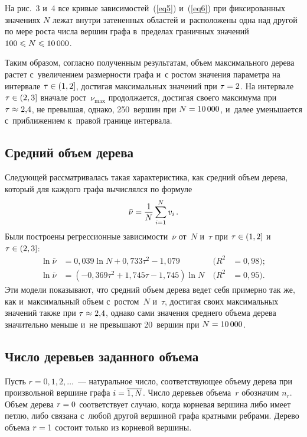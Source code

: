 \begin{multicols}{2}
На рис.~3 и~4 все кривые зависимостей~(\ref{eq5}) и~(\ref{eq6}) при 
фиксированных значениях $N$ лежат внутри затененных областей и~расположены одна 
над другой по мере роста числа вершин графа в~пределах граничных значений 
$100\hm\leqslant N\hm\leqslant 10\,000$.

Таким образом, согласно полученным результатам, объем максимального дерева 
растет с~увеличением размерности графа и~с ростом значения параметра на интервале 
$\tau\hm\in(1,2]$,
достигая максимальных значений при $\tau\hm=2$.
На интервале $\tau\hm\in(2,3]$ вначале рост~$\nu_{\max}$ продолжается, достигая 
своего максимума
при $\tau\hm\approx 2{,}4$, не превышая, однако, 250~вершин при $N\hm=10\,000$, и~далее 
уменьшается с~приближением к~правой границе интервала.

\vspace*{-4pt}

\subsection{Средний объем дерева}

Следующей рассматривалась такая характеристика, как средний объем дерева, 
который для каж\-до\-го графа вычислялся по формуле
\begin{equation*}
\bar{\nu}=\displaystyle\frac{\displaystyle 1\mathstrut}{\displaystyle N\mathstrut}\sum\limits_{i=1}^N v_i\,.
\end{equation*}
Были построены регрессионные зависимости~$\bar{\nu}$ от~$N$ и~$\tau$ при 
$\tau\hm\in(1,2]$ и~$\tau\hm\in(2,3]$:
\begin{alignat*}{2}
\ln\bar{\nu} &= 0{,}039\ln N + 0{,}733 \tau^2 - 1{,}079 &\ (R^2&=0{,}98);
\\
\ln\bar{\nu} &= (-0{,}369 \tau^2+1{,}745 \tau-1{,}745)\ln N &\ (R^2&=0{,}95).
\end{alignat*}
Эти модели показывают, что средний объем дерева ведет себя примерно так же, как и~максимальный объем с~ростом~$N$ и~$\tau$, достигая своих максимальных значений 
также при $\tau\hm\approx 2{,}4$, однако сами значения среднего объема дерева 
значительно меньше и~не превышают 20~вершин при $N\hm=10\,000$.



\subsection{Число деревьев заданного объема}

Пусть $r=0,1,2,\ldots$~--- натуральное число, соответствующее объему дерева 
при произвольной вершине графа $i\hm=\overline{1,N}$. Число деревьев объема~$r$ обозначим 
$n_r$.
Объем дерева $r\hm=0$ соответствует случаю, когда корневая вершина либо имеет 
петлю, либо связана с~любой другой вершиной графа кратными ребрами. Дерево 
объема $r\hm=1$ состоит только из корневой вершины.


\end{multicols}
